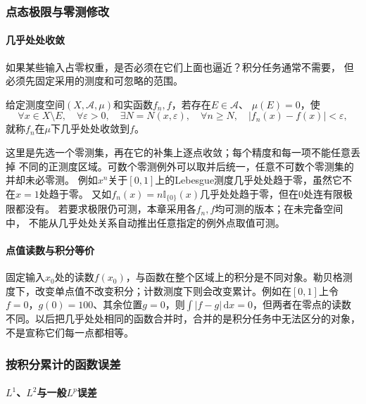\subsubsection{点态极限与零测修改}
\paragraph{几乎处处收敛}

如果某些输入占零权重，是否必须在它们上面也逼近？积分任务通常不需要，
但必须先固定采用的测度和可忽略的范围。
\begin{definition}[几乎处处收敛]
\label{def:analysis-almost-everywhere-convergence}
给定测度空间$(X,\mathcal A,\mu)$和实函数$f_n,f$，若存在$E\in\mathcal A$、
$\mu(E)=0$，使
\[
 \forall x\in X\setminus E,\quad
 \forall\varepsilon>0,\quad
 \exists N=N(x,\varepsilon),\quad
 \forall n\geq N,\quad |f_n(x)-f(x)|<\varepsilon,
\]
就称$f_n$在$\mu$下几乎处处收敛到$f$。
\end{definition}
这里是先选一个零测集，再在它的补集上逐点收敛；每个精度和每一项不能任意丢掉
不同的正测度区域。可数个零测例外可以取并后统一，任意不可数个零测集的并却未必零测。
例如$x^n$关于$[0,1]$上的Lebesgue测度几乎处处趋于零，虽然它不在$x=1$处趋于零。
又如$f_n(x)=n\mathbb I_{\{0\}}(x)$几乎处处趋于零，但在$0$处连有限极限都没有。
若要求极限仍可测，本章采用各$f_n,f$均可测的版本；在未完备空间中，
不能从几乎处处关系自动推出任意指定的例外点取值可测。

\paragraph{点值读数与积分等价}

固定输入$x_0$处的读数$f(x_0)$，与函数在整个区域上的积分是不同对象。勒贝格测度下，改变单点值不改变积分；计数测度下则会改变累计。例如在$[0,1]$上令$f=0$，$g(0)=100$、其余位置$g=0$，则$\int|f-g|\,\mathrm dx=0$，但两者在零点的读数不同。以后把几乎处处相同的函数合并时，合并的是积分任务中无法区分的对象，不是宣称它们每一点都相等。

\subsubsection{按积分累计的函数误差}
\paragraph{$L^1$、$L^2$与一般$L^p$误差}

